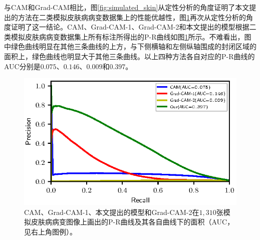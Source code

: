 与CAM和Grad-CAM相比，图\ref{fig:simulated_skin}从定性分析的角度证明了本文提出的方法在二类模拟皮肤病病变数据集上的性能优越性，图\ref{fig:simulated_skin_pr_curve}再次从定性分析的角度证明了这一结论。CAM、Grad-CAM-1、Grad-CAM-2和本文提出的模型根据二类模拟皮肤病病变数据集上所有标注所得出的P-R曲线如图\ref{fig:simulated_skin_pr_curve}所示。不难看出，图中绿色曲线明显在其他三条曲线的上方，与下侧横轴和左侧纵轴围成的封闭区域的面积上，绿色曲线也明显大于其他三条曲线。以上四种方法各自对应的P-R曲线的AUC分别是$0.075$、$0.146$、$0.009$和$0.397$。
\begin{figure}[h]
	\centering
	\includegraphics[width=1.0\textwidth]{figure/pr_curve_skin_image/pr_curve.eps}
	\caption{CAM、Grad-CAM-1、本文提出的模型和Grad-CAM-2在$1,310$张模拟皮肤病病变图像上画出的P-R曲线及其各自曲线下的面积（AUC，见右上角图例）。}
	\label{fig:simulated_skin_pr_curve}
\end{figure}

